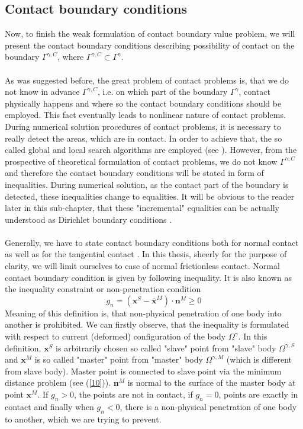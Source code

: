 \documentclass{article}
\newcommand{\beq}{\begin{equation}}
\newcommand{\eeq}{\end{equation}}
\begin{document}
\subsection{Contact boundary conditions}
Now, to finish the weak formulation of contact boundary value problem, we will present the contact boundary conditions describing possibility of contact on the boundary $ \Gamma^{\gamma,C}$, where $ \Gamma^{\gamma,C} \subset \Gamma^{\gamma} $.
\\
\\
As was suggested before, the great problem of contact problems is, that we do not know in advance $ \Gamma^{\gamma,C}$, i.e. on which part of the boundary $ \Gamma^{\gamma} $, contact physically happens and where so the contact boundary conditions should be employed. This fact eventually leads to nonlinear nature of contact problems. During numerical solution procedures of contact problems, it is necessary to really detect the areas, which are in contact. In order to achieve that, the so called global and local search algorithms are employed (see \cite[Chapter 9]{Wriggers}). However, from the prospective of theoretical formulation of contact problems, we do not know $ \Gamma^{\gamma,C}$ and therefore the contact boundary conditions will be stated in form of inequalities. During numerical solution, as the contact part of the boundary is detected, these inequalities change to equalities. It will be obvious to the reader later in this sub-chapter, that these "incremental" equalities can be actually understood as Dirichlet boundary conditions \cite[Chapter 4, p.109]{Yastrebov}.
\\
\\
Generally, we have to state contact boundary conditions both for normal contact as well as for the tangential contact \cite[Chapter 3, p.46]{Wriggers}. In this thesis, sheerly for the purpose of clarity, we will limit ourselves to case of normal frictionless contact. Normal contact boundary condition is given by following inequality. It is also known as the inequality constraint or non-penetration condition \cite[Chapter 3, p.47]{Wriggers}  
\beq\label{9}
g_{n}=\left(\mathbf{x}^{S}-\overline{\mathbf{x}}^{M}\right) \cdot \mathbf{n}^{M} \geq 0
\eeq  
Meaning of this definition is, that non-physical penetration of one body into another is  prohibited. We can firstly observe, that the inequality is formulated with respect to current (deformed) configuration of the body $\Omega^{\gamma} $. In this definition, $ \mathbf{x}^{S} $ is arbitrarily chosen so called "slave" point from "slave" body $\Omega^{\gamma,S} $ and $\mathbf{x}^{M} $ is so called "master" point from "master" body $\Omega^{\gamma,M} $ (which is different from slave body). Master point is connected to slave point via the minimum distance problem (see (\ref{10})). $ \mathbf{n}^{M} $ is normal to the surface of the master body at point $\mathbf{x}^{M} $. If $ g_{n} > 0 $, the points are not in contact, if $ g_{n} = 0 $, points are exactly in contact and finally when $ g_{n} < 0 $, there is a non-physical penetration of one body to another, which we are trying to prevent.   
\end{document}

